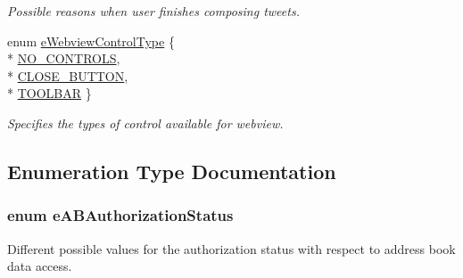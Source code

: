 \begin{DoxyCompactItemize}
\begin{DoxyCompactList}\small\item\em Possible reasons when user finishes composing tweets. \end{DoxyCompactList}\item 
enum \hyperlink{namespace_voxel_busters_1_1_native_plugins_a30c9f3d09eec86c955a0f96b781e8cae}{e\+Webview\+Control\+Type} \{ \\*
\hyperlink{namespace_voxel_busters_1_1_native_plugins_a30c9f3d09eec86c955a0f96b781e8caeafae75e10c659660dcf24370607f24e6e}{N\+O\+\_\+\+C\+O\+N\+T\+R\+O\+L\+S}, 
\\*
\hyperlink{namespace_voxel_busters_1_1_native_plugins_a30c9f3d09eec86c955a0f96b781e8caea5f5b0ec811202aec49b10bc69762bbd1}{C\+L\+O\+S\+E\+\_\+\+B\+U\+T\+T\+O\+N}, 
\\*
\hyperlink{namespace_voxel_busters_1_1_native_plugins_a30c9f3d09eec86c955a0f96b781e8caeacf4b2ed50ec6bdf4d8e85e76e22f89fb}{T\+O\+O\+L\+B\+A\+R}
 \}
\begin{DoxyCompactList}\small\item\em Specifies the types of control available for webview. \end{DoxyCompactList}\end{DoxyCompactItemize}


\subsection{Enumeration Type Documentation}
\hypertarget{namespace_voxel_busters_1_1_native_plugins_a52e7845cde15260bea7e2d269fd8711c}{}
\subsubsection[{e\+A\+B\+Authorization\+Status}]{\setlength{\rightskip}{0pt plus 5cm}enum {\bf e\+A\+B\+Authorization\+Status}}\label{namespace_voxel_busters_1_1_native_plugins_a52e7845cde15260bea7e2d269fd8711c}


Different possible values for the authorization status with respect to address book data access. 

